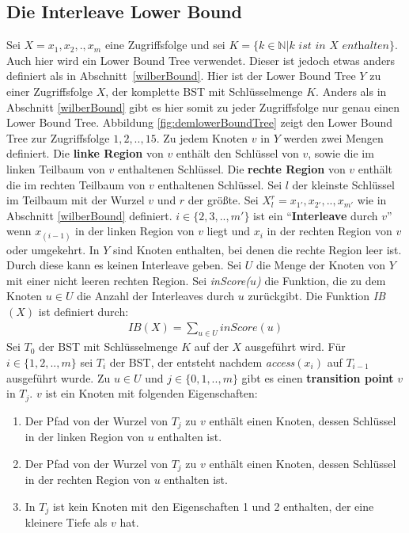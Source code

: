 \documentclass[a4paper,12pt]{article}
\begin{document}
\subsection{Die Interleave Lower Bound} \label{interBound}
Sei $X = x_1,x_2,.,x_m$ eine Zugriffsfolge und sei $K = \{k \in \mathbb{N} \vert k \textit{ ist in $X$ enthalten}\}$. Auch hier wird ein Lower Bound Tree verwendet. Dieser ist jedoch etwas anders definiert als in \mbox{Abschnitt \ref{wilberBound}}. Hier ist der Lower Bound Tree $Y$ zu einer Zugriffsfolge $X$, der komplette BST mit Schlüsselmenge $K$. Anders als in Abschnitt \ref{wilberBound}  gibt es hier somit zu jeder Zugriffsfolge nur genau einen Lower Bound Tree. Abbildung \ref{fig:demlowerBoundTree} zeigt den Lower Bound Tree zur Zugriffsfolge $1, 2,.., 15$. Zu jedem Knoten $v$ in $Y$ werden zwei Mengen definiert. Die \textbf{linke Region} von $v$ enthält den Schlüssel von $v$, sowie die im linken Teilbaum von $v$ enthaltenen Schlüssel.  Die \textbf{rechte Region} von $v$ enthält die im rechten Teilbaum von $v$ enthaltenen Schlüssel. Sei $l$ der kleinste Schlüssel im Teilbaum mit der Wurzel $v$ und $r$ der größte. Sei  $X^r_l = {x_{1'},x_{2'},..,x_{m'}}$ wie in Abschnitt \ref{wilberBound} definiert. $i \in \{2,3,..,m'\}$ ist ein \enquote{\textbf{Interleave} durch $v$} wenn $x_{\left(i -1\right)}$ in der linken Region von $v$ liegt und $x_i$ in der rechten Region von $v$ oder umgekehrt. In $Y$ sind Knoten enthalten, bei denen die rechte Region leer ist. Durch diese kann es keinen Interleave geben. Sei $U$ die Menge der Knoten von $Y$ mit einer nicht leeren rechten Region. Sei \textit{inScore($u$)} die Funktion, die zu dem Knoten $u \in U$ die Anzahl der Interleaves durch $u$ zurückgibt.  Die Funktion \textit{IB$\left(X\right)$} ist definiert durch:
\begin{align*}
\mathit{IB}\left(X\right) = \sum_{u \in U} \mathit{inScore}\left(u\right)
\end{align*}
Sei $T_0$ der BST mit Schlüsselmenge $K$ auf der $X$ ausgeführt wird. Für $i \in \{1,2,..,m\}$ sei $T_i$ der BST, der entsteht nachdem \textit{access}$\left(x_i\right)$ auf $T_{i-1}$ ausgeführt wurde. Zu $u \in U$ und  $j \in \{0,1,..,m\}$ gibt es einen \textbf{transition point} $v$ in $T_j$. $v$ ist ein Knoten mit folgenden Eigenschaften:\\
\begin{enumerate}
	\item Der Pfad von der Wurzel von $T_j$ zu $v$ enthält einen Knoten, dessen Schlüssel in der linken Region von $u$ enthalten ist.
	\item Der Pfad von der Wurzel von $T_j$ zu $v$ enthält einen Knoten, dessen Schlüssel in der rechten Region von $u$ enthalten ist.
	\item In $T_j$ ist kein Knoten mit den Eigenschaften 1 und 2 enthalten, der eine kleinere Tiefe als $v$ hat. 
\end{enumerate}
\end{document}
